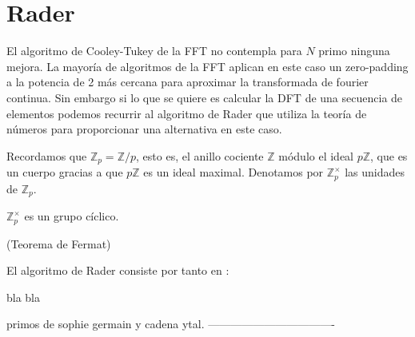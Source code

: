 \section{Rader}
El algoritmo de Cooley-Tukey de la FFT no contempla para $N$ primo ninguna mejora.
La mayoría de algoritmos de la FFT aplican en este caso un zero-padding  a la potencia de 2 más cercana para aproximar la transformada de fourier continua.
Sin embargo si lo que se quiere es calcular la DFT de una secuencia de elementos podemos recurrir al algoritmo de Rader que utiliza la teoría de números  para proporcionar una alternativa en este caso.


Recordamos que  $\mathbb{Z}_p = \mathbb{Z}/p$, esto es, el anillo cociente $\mathbb{Z}$ módulo el ideal  ${p\mathbb{Z}}$, que es un cuerpo gracias a que $p\mathbb{Z}$ es un ideal maximal.
Denotamos por $\mathbb{Z}_p^\times$ las unidades de 
$\mathbb{Z}_p.$

\begin{teorema}
        $\mathbb{Z}_p^\times$ es un grupo cíclico.
\end{teorema}

\begin{teorema}
    (Teorema de Fermat)
\end{teorema}

El algoritmo de Rader consiste por tanto en :
 



bla bla


primos de sophie germain y cadena ytal.
----------------------------------



 








